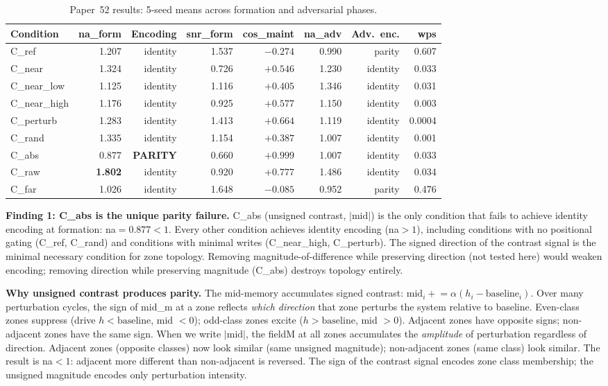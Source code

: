 \documentclass[11pt,a4paper]{article}
\begin{document}
\begin{table}[h]
\centering
\caption{Paper~52 results: 5-seed means across formation and adversarial phases.}
\label{tab:main}
\begin{tabular}{lrrrrrrr}
\toprule
Condition & na\_form & Encoding & snr\_form & cos\_maint & na\_adv & Adv.\ enc. & wps \\
\midrule
C\_ref       & 1.207 & identity  & 1.537 & $-0.274$ & 0.990 & parity  & 0.607 \\
C\_near      & 1.324 & identity  & 0.726 & $+0.546$ & 1.230 & identity& 0.033 \\
C\_near\_low & 1.125 & identity  & 1.116 & $+0.405$ & 1.346 & identity& 0.031 \\
C\_near\_high& 1.176 & identity  & 0.925 & $+0.577$ & 1.150 & identity& 0.003 \\
C\_perturb   & 1.283 & identity  & 1.413 & $\mathbf{+0.664}$ & 1.119 & identity& 0.0004 \\
C\_rand      & 1.335 & identity  & 1.154 & $+0.387$ & 1.007 & identity& 0.001 \\
C\_abs       & 0.877 & \textbf{PARITY} & 0.660 & $+0.999$ & 1.007 & identity& 0.033 \\
C\_raw       & \textbf{1.802} & identity  & 0.920 & $+0.777$ & 1.486 & identity& 0.034 \\
C\_far       & 1.026 & identity  & 1.648 & $-0.085$ & 0.952 & parity  & 0.476 \\
\bottomrule
\end{tabular}
\end{table}

\textbf{Finding 1: C\_abs is the unique parity failure.}
C\_abs (unsigned contrast, $|\mathrm{mid}|$) is the only condition that fails to
achieve identity encoding at formation: na$=0.877 < 1$.
Every other condition achieves identity encoding (na$>1$), including conditions
with no positional gating (C\_ref, C\_rand) and conditions with minimal writes
(C\_near\_high, C\_perturb).
The signed direction of the contrast signal is the minimal necessary condition
for zone topology.
Removing magnitude-of-difference while preserving direction (not tested here)
would weaken encoding; removing direction while preserving magnitude (C\_abs)
destroys topology entirely.

\textbf{Why unsigned contrast produces parity.}
The mid-memory accumulates signed contrast:
$\mathrm{mid}_i \mathrel{+}= \alpha(h_i - \mathrm{baseline}_i)$.
Over many perturbation cycles, the sign of mid\_m at a zone reflects
\emph{which direction} that zone perturbs the system relative to baseline.
Even-class zones suppress (drive $h < \mathrm{baseline}$, mid $< 0$);
odd-class zones excite ($h > \mathrm{baseline}$, mid $> 0$).
Adjacent zones have opposite signs; non-adjacent zones have the same sign.
When we write $|\mathrm{mid}|$, the fieldM at all zones accumulates the
\emph{amplitude} of perturbation regardless of direction.
Adjacent zones (opposite classes) now look similar (same unsigned magnitude);
non-adjacent zones (same class) look similar.
The result is na$<1$: adjacent more different than non-adjacent is reversed.
The sign of the contrast signal encodes zone class membership; the unsigned
magnitude encodes only perturbation intensity.
\end{document}
